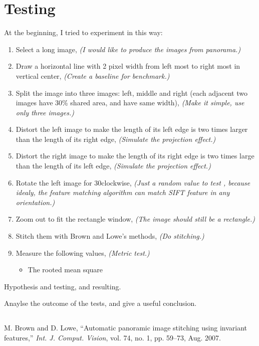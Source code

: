 \documentclass[10pt,twocolumn,letterpaper]{article}
\begin{document}
\section{Testing}
At the beginning, I tried to experiment in this way:
\begin{enumerate}
    \item Select a long image, \textit{(I would like to produce the images from panorama.)}
    \item Draw a horizontal line with 2 pixel width from left most to right most in vertical center, \textit{(Create a baseline for benchmark.)}
    \item Split the image into three images: left, middle and right (each adjacent two images have 30\% shared area, and have same width), \textit{(Make it simple, use only three images.)}
    \item Distort the left image to make the length of its left edge is two times larger than the length of its right edge, \textit{(Simulate the projection effect.)}
    \item Distort the right image to make the length of its right edge is two times large than the length of its left edge, \textit{(Simulate the projection effect.)}
    \item Rotate the left image for 30\degree clockwise, \textit{(Just a random value to test , because idealy, the feature matching algorithm can match SIFT feature in any orientation.)}
    \item Zoom out to fit the rectangle window, \textit{(The image should still be a rectangle.)}
    \item Stitch them with Brown and Lowe's methods, \textit{(Do stitching.)}
    \item Measure the following values, \textit{(Metric test.)} 
    \begin{itemize}
        \item The rooted mean square 
    \end{itemize}
\end{enumerate}


Hypothesis and testing, and resulting.

Anaylse the outcome of the tests, and give a useful conclusion.

\subsection{}


\begin{thebibliography}{9}
M. Brown and D. Lowe, ``Automatic panoramic image stitching using invariant features,''
\textit{Int. J. Comput. Vision}, vol. 74, no. 1, pp. 59–73, Aug. 2007.

\end{thebibliography}
\end{document}
